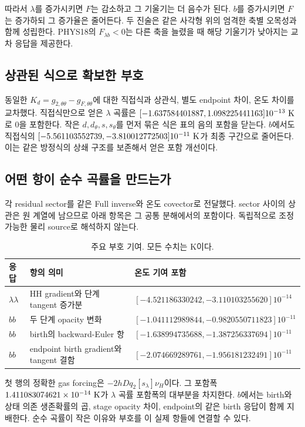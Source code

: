 따라서 $\lambda$를 증가시키면 $F$는 감소하고 그 기울기는 더 음수가 된다.
$b$를 증가시키면 $F$는 증가하되 그 증가율은 줄어든다.
두 진술은 같은 사각형 위의 엄격한 축별 오목성과 함께 성립한다.
PHYS18의 $F_{\lambda b}<0$는 다른 축을 늘렸을 때 해당 기울기가
낮아지는 교차 응답을 제공한다.

\subsection{상관된 식으로 확보한 부호}
동일한 $K_d=g_{2,\theta\theta}-g_{F,\theta\theta}$에 대한 직접식과
상관식, 별도 endpoint 차이, 온도 차이를 교차했다.
직접식만으로 얻은 $\lambda$ 곡률은
$[-1.637584401887,1.098225441163]10^{-13}\ {\rm K}$로 0을 포함한다.
작은 $d,d_\theta,s,s_\theta$를 먼저 묶은 식은 표의 음의 포함을 닫는다.
$b$에서도 직접식의
$[-5.561103552739,-3.810012772503]10^{-11}\ {\rm K}$가 최종 구간으로 줄어든다.
이는 같은 방정식의 상쇄 구조를 보존해서 얻은 포함 개선이다.

\subsection{어떤 항이 순수 곡률을 만드는가}
각 residual sector를 같은 Full inverse와 온도 covector로 전달했다.
sector 사이의 상관은 원 계열에 남으므로 아래 항목은 그 공통 분해에서의 포함이다.
독립적으로 조정 가능한 물리 source로 해석하지 않는다.
\begin{table}[H]\centering\small
\caption{주요 부호 기여. 모든 수치는 K이다.}
\begin{tabularx}{\textwidth}{lXl}
\toprule
응답 & 항의 의미 & 온도 기여 포함\\
\midrule
$\lambda\lambda$ & HH gradient와 단계 tangent 증가분 &
$[-4.521186330242,-3.110103255620]10^{-14}$\\
$bb$ & 두 단계 opacity 변화 &
$[-1.041112989844,-0.9820550711823]10^{-11}$\\
$bb$ & birth의 backward-Euler 항 &
$[-1.638994735688,-1.387256337694]10^{-11}$\\
$bb$ & endpoint birth gradient와 tangent 결함 &
$[-2.074669289761,-1.956181232491]10^{-11}$\\
\bottomrule
\end{tabularx}
\end{table}

첫 행의 정확한 gas forcing은 $-2hDq_2[s_\lambda]\nu_H$이다.
그 포함폭 $1.411083074621\times10^{-14}\ {\rm K}$가
$\lambda$ 곡률 포함폭의 대부분을 차지한다.
$b$에서는 birth와 상태 의존 생존확률의 곱,
stage opacity 차이, endpoint의 같은 birth 응답이 함께 지배한다.
순수 곡률이 작은 이유와 부호를 이 실제 항들에 연결할 수 있다.

